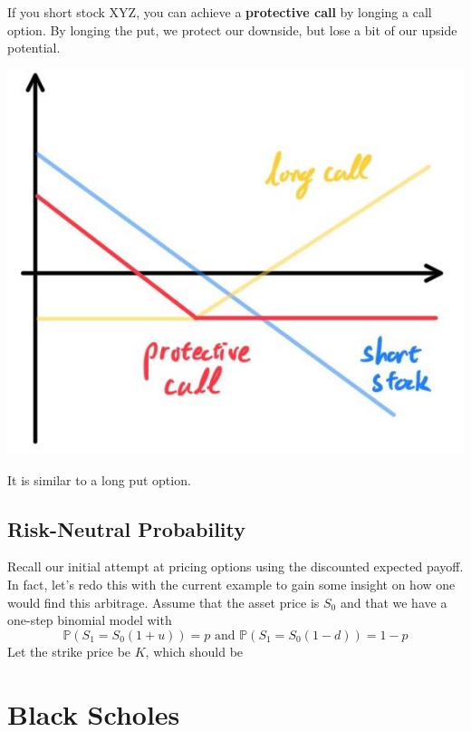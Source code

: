 \documentclass{article}
\begin{document}
    \begin{definition}
      If you short stock XYZ, you can achieve a \textbf{protective call} by longing a call option. By longing the put, we protect our downside, but lose a bit of our upside potential. 
      \begin{center}
        \includegraphics[scale=0.3]{img/protective_call.jpg}
      \end{center}
      It is similar to a long put option. 
    \end{definition}

  \subsection{Risk-Neutral Probability}

    Recall our initial attempt at pricing options using the discounted expected payoff. In fact, let's redo this with the current example to gain some insight on how one would find this arbitrage. Assume that the asset price is $S_0$ and that we have a one-step binomial model with 
    \begin{equation}
      \mathbb{P}(S_1 = S_0 (1 + u)) = p \text{ and } \mathbb{P}(S_1 = S_0 (1 - d)) = 1 - p
    \end{equation}
    Let the strike price be $K$, which should be  

\section{Black Scholes}
\end{document}
